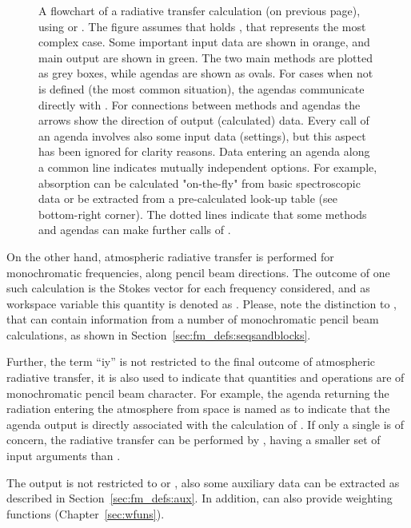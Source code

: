 \begin{figure}[t]
  \caption{A flowchart of a radiative transfer calculation (on previous page),
    using  or . The figure assumes that
     holds , that
    represents the most complex case. Some important input data are shown in
    orange, and main output are shown in green. The two main methods are
    plotted as grey boxes, while agendas are shown as ovals. For cases when
     not is defined (the most common situation),
    the agendas communicate directly with . For
    connections between methods and agendas the arrows show the direction of
    output (calculated) data. Every call of an agenda involves also some input
    data (settings), but this aspect has been ignored for clarity reasons. Data
    entering an agenda along a common line indicates mutually independent
    options. For example, absorption can be calculated "on-the-fly" from basic
    spectroscopic data or be extracted from a pre-calculated look-up table (see
    bottom-right corner). The dotted lines indicate that some methods and
    agendas can make further calls of .}
  \label{fig:ycalc_flow}
\end{figure}

On the other hand, atmospheric radiative transfer is performed for
monochromatic frequencies, along pencil beam directions. The outcome of one
such calculation is the Stokes vector for each frequency considered, and as
workspace variable this quantity is denoted as . Please, note the
distinction to , that can contain information from a number of
monochromatic pencil beam calculations, as shown in
Section~\ref{sec:fm_defs:seqsandblocks}.

Further, the term ``iy'' is not restricted to the final outcome of atmospheric
radiative transfer, it is also used to indicate that quantities and operations
are of monochromatic pencil beam character. For example, the agenda returning
the radiation entering the atmosphere from space is named as
 to indicate that the agenda output is directly
associated with the calculation of . If only a single
 is of concern, the radiative transfer can be performed by
, having a smaller set of input arguments than
.

The output is not restricted to  or , also some
auxiliary data can be extracted as described in Section~\ref{sec:fm_defs:aux}.
In addition,  can also provide weighting functions
(Chapter~\ref{sec:wfuns}).








